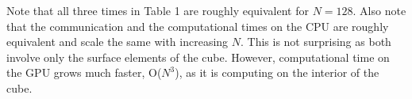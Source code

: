 Note that all three times in Table 1 are roughly equivalent for $N=128$.  Also note that
the communication and the computational times on the CPU are roughly equivalent and scale
the same with increasing $N$.  This is not surprising as both involve only the surface
elements of the cube.  However, computational time on the GPU grows much faster, O($N^3$),
as it is computing on the interior of the cube.

\begin{comment}
The current implementation does \emph{not} take advantage of optimization strategies such
as prefetching of array tiles (including halos) into OpenCL local memory.  Neither does it
take advantage of the potential of CAFe to overlap communication with computation (for
example, computing on ...
\end{comment}

\begin{comment}
Since many scientific codes are dominated by memory performance, including and especially
stencil algorithms as they typically only involve a computation on a small locally central
array element and a small overlapping halo region.  Stencil operations frequently do not
contain enough floating point operations per memory load to allow for floating point
performance to operate at peak (though this is entirely application and domain specific).
Thus we illustrate the \emph{potential} for performance by noting the latency and
throughput performance of an attached GPU in conjunction with MPI distributed memory
performance associated with halo transfer in Table 1.
\end{comment}

\begin{comment}
The results in Table 1 indicate that the primary bottleneck in using accelerators attached
to the TODO bus using OpenCL is likely to be the latency in transferring memory to and
from the device for distributed memory clusters of only a few nodes exchanging halo data
using MPI.
\end{comment}

